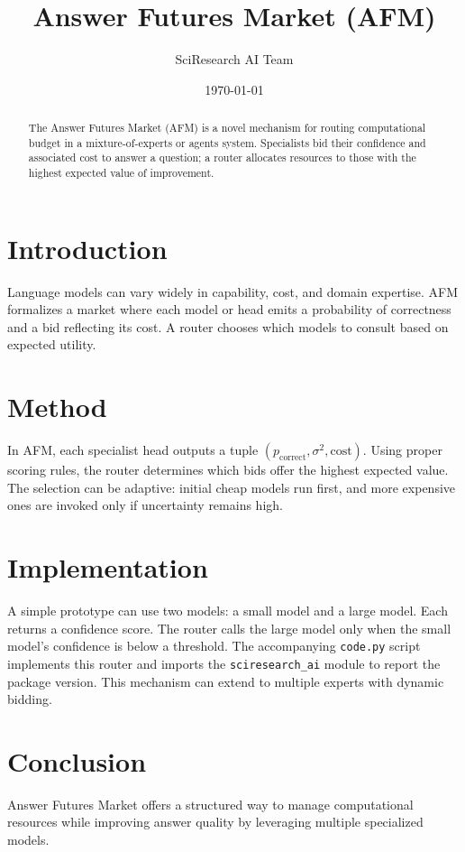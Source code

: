 \documentclass{article}
\title{Answer Futures Market (AFM)}
\author{SciResearch AI Team}
\date{\today}
\begin{document}
\maketitle
\begin{abstract}
The Answer Futures Market (AFM) is a novel mechanism for routing
computational budget in a mixture-of-experts or agents system.
Specialists bid their confidence and associated cost to answer a
question; a router allocates resources to those with the highest
expected value of improvement.
\end{abstract}
\section{Introduction}
Language models can vary widely in capability, cost, and domain
expertise. AFM formalizes a market where each model or head emits a
probability of correctness and a bid reflecting its cost. A router
chooses which models to consult based on expected utility.
\section{Method}
In AFM, each specialist head outputs a tuple $(p_{\text{correct}},
\sigma^2, \text{cost})$. Using proper scoring rules, the router
determines which bids offer the highest expected value. The selection
can be adaptive: initial cheap models run first, and more expensive
ones are invoked only if uncertainty remains high.
\section{Implementation}
A simple prototype can use two models: a small model and a large
model. Each returns a confidence score. The router calls the large
model only when the small model's confidence is below a threshold. The
accompanying \texttt{code.py} script implements this router and
imports the \texttt{sciresearch\_ai} module to report the package
version. This mechanism can extend to multiple experts with dynamic
bidding.
\section{Conclusion}
Answer Futures Market offers a structured way to manage computational
resources while improving answer quality by leveraging multiple
specialized models.
\end{document}
